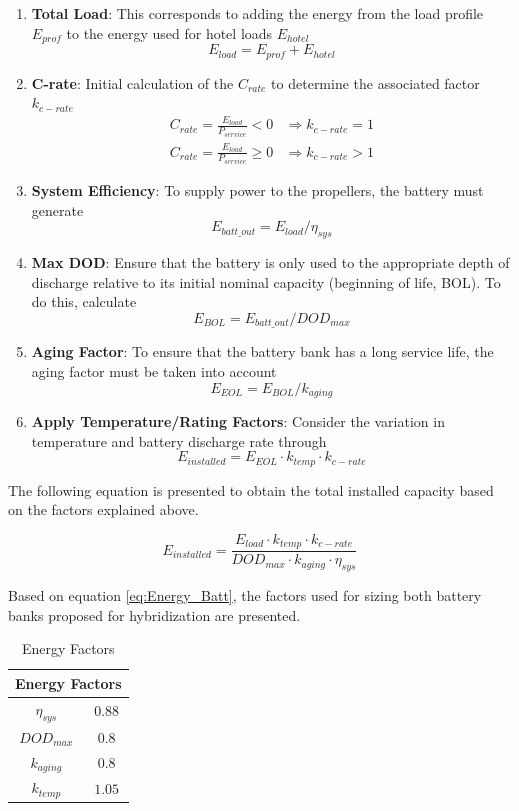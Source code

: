 \begin{enumerate}
	\item \textbf{Total Load}: This corresponds to adding the energy from the load profile ${E}_{prof}$ to the energy used for hotel loads ${E}_{hotel}$ $${E}_{load}={E}_{prof}+{E}_{hotel}$$
	\item \textbf{C-rate}: Initial calculation of the ${C}_{rate}$ to determine the associated factor $k_{c-rate}$ 
\begin{align*}
{C}_{rate}=\frac{{E}_{load}}{{P}_{service}}<0 & \Rightarrow k_{c-rate} = 1\\
{C}_{rate}=\frac{{E}_{load}}{{P}_{service}}\geq 0 & \Rightarrow k_{c-rate} >1
\end{align*}
	
	\item \textbf{System Efficiency}: To supply power to the propellers, the battery must generate $${E}_{batt{\_}out}={E}_{load}/{\eta}_{sys}$$
	\item \textbf{Max DOD}: Ensure that the battery is only used to the appropriate depth of discharge relative to its initial nominal capacity (beginning of life, BOL).  To do this, calculate $${E}_{BOL}={E}_{batt{\_}out}/{DOD}_{max}$$
	\item \textbf{Aging Factor}: To ensure that the battery bank has a long service life, the aging factor must be taken into account  $${E}_{EOL}={E}_{BOL}/{k}_{aging}$$
	\item \textbf{Apply Temperature/Rating Factors}: Consider the variation in temperature and battery discharge rate through $${E}_{installed}={E}_{EOL}\cdot{k}_{temp}\cdot{k}_{c-rate}$$
\end{enumerate}

The following equation is presented to obtain the total installed capacity based on the factors explained above.

\begin{equation}\label{eq:Energy_Batt}
	{E}_{installed}= \frac{{E}_{load}\cdot{k}_{temp}\cdot{k}_{c-rate}}{{DOD}_{max}\cdot{k}_{aging}\cdot{\eta}_{sys}}
\end{equation}

Based on equation \eqref{eq:Energy_Batt}, the factors used for sizing both battery banks proposed for hybridization are presented.


\begin{table}[H]
	\centering
	\caption{Energy Factors}
	\label{tab:Energy_factors}
	\begin{tabular}{|c|c|}
		\hline
		\multicolumn{2}{|c|}{\textbf{Energy Factors}} \\
		\hline\hline
		${\eta}_{sys}$ & $0.88$    \\	
		\hline
		${DOD}_{max}$ & $0.8$    \\
		\hline  
		${k}_{aging}$ & $0.8$    \\		
		\hline		
		${k}_{temp}$ & $1.05$    \\
		\hline		
	\end{tabular}
	\end{table} 


